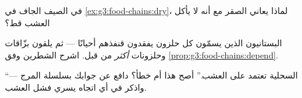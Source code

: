 \begin{exercise}[$\star$]\label{exo:g3:food-chains:8}
في الصيف الجاف في \cref{ex:g3:food-chains:dry}، لماذا يعاني الصقر
مع أنه لا يأكل العشب قط؟
\end{exercise}

\begin{exercise}[$\star\star$]\label{exo:g3:food-chains:9}
البستانيون الذين يسمّون كل حلزون يفقدون قنفذهم أحيانًا --- ثم
يلقون بزّاقات وحلزونات \emph{أكثر} من قبل. اشرح الشطرين وفق
\cref{prop:g3:food-chains:depend}.
\end{exercise}

\begin{exercise}[$\star\star$]\label{exo:g3:food-chains:10}
``السحلية تعتمد على العشب.'' أصح هذا أم خطأ؟ دافع عن جوابك
بسلسلة المرج --- واذكر في أي اتجاه يسري فشل العشب.
\end{exercise}
